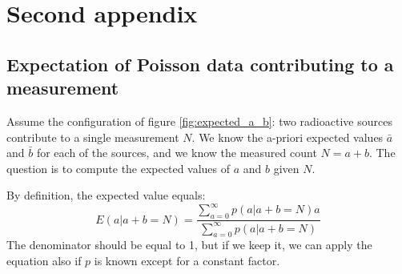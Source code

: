 \chapter{Second appendix}

\section{Expectation of Poisson data contributing to a measurement} \label{app:expected_a_b}
Assume the configuration of figure \ref{fig:expected_a_b}: two radioactive
sources contribute to a single measurement $N$. We know the a-priori expected
values $\bar{a}$ and $\bar{b}$ for each of the sources, and we know the
measured count $N = a + b$. The question is to compute the expected values of
$a$ and $b$ given $N$.

 By definition, the expected value equals:
\begin{equation}
  E(a | a + b = N) = \frac{\sum_{a=0}^\infty p(a | a + b = N) a}
                          {\sum_{a=0}^\infty p(a | a + b = N)}
  \label{eq:appab1}
\end{equation}
The denominator should be equal to 1, but if we keep it, we can apply the
equation also if $p$ is known except for a constant factor.

